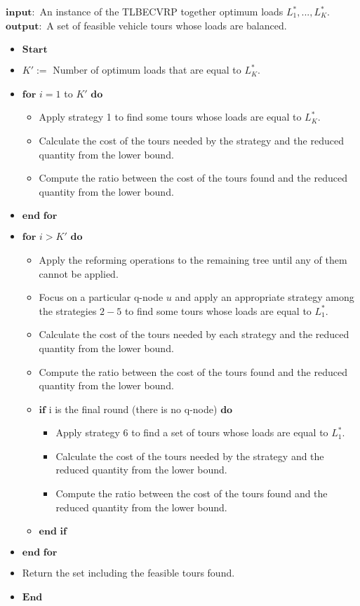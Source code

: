 \begin{algorithm}
\caption {} 
$\mathbf{input:}$ An instance of the TLBECVRP together optimum loads $L_1^*,...,L_K^*$.\\
$\mathbf{output:}$ A set of feasible vehicle tours whose loads are balanced.
\begin{itemize}
\item[] $\mathbf{Start}$
\item[]  $K':=$ Number of optimum loads that are equal to $L^*_K$.
\item[] $\mathbf{for}$ $ i=1$ to $ K'$ $\mathbf{do}$
\begin{itemize}
\item[] Apply strategy 1 to find some tours whose loads are equal to $L_K^*$.
\item[] Calculate the cost of the tours needed by the strategy and the reduced quantity from the lower bound. 
\item[] Compute the ratio between the cost of the tours found and the reduced quantity from the lower bound.
\end{itemize}
\item[] $\mathbf{end \,\, for}$
\item[] $\mathbf{for}$ $ i> K'$ $\mathbf{do}$
\begin{itemize}
\item[] Apply the reforming operations to the remaining tree until any of them cannot be applied.
\item[] Focus on a particular q-node $u$ and apply an appropriate strategy among the strategies $2-5$ to find some tours whose loads are equal to $L_1^*$.
\item[] Calculate the cost of the tours needed by each strategy and the reduced quantity from the lower bound. 
\item[] Compute the ratio between the cost of the tours found and the reduced quantity from the lower bound.
\item[] $\mathbf{if}$ i is the final round (there is no q-node) $\mathbf{do}$
\begin{itemize}
\item[] Apply strategy 6 to find a set of tours whose loads are equal to $L_1^*$.
\item[] Calculate the cost of the tours needed by the strategy and the reduced quantity from the lower bound. 
\item[] Compute the ratio between the cost of the tours found and the reduced quantity from the lower bound.
\end{itemize}
\item[] $\mathbf{end\,\, if}$ 
\end{itemize}
\item[] $\mathbf{end \,\,for}$
\item[] Return the set including the feasible tours found.
\item[] $\mathbf{End}$
\end{itemize} 
\end{algorithm} 
